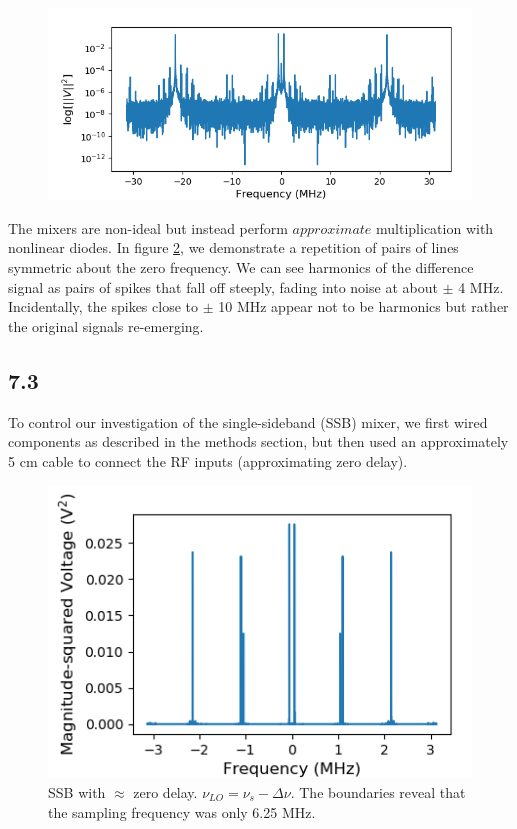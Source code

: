 \documentclass[a4paper]{article}
\begin{document}

\begin{figure}
\centering
\includegraphics[width=.8\linewidth]{7-2}
\caption{}
\label{fig:failure}
\end{figure}

The mixers are non-ideal but instead perform $approximate$ multiplication with nonlinear diodes. In figure \ref{fig:intermods}, we demonstrate a repetition of pairs of lines symmetric about the zero frequency. We can see harmonics of the difference signal as pairs of spikes that fall off steeply, fading into noise at about $\pm$ 4 MHz. Incidentally, the spikes close to $\pm$ 10 MHz appear not to be harmonics but rather the original signals re-emerging.

\subsection{7.3}

To control our investigation of the single-sideband (SSB) mixer, we first wired components as described in the methods section, but then used an approximately 5 cm cable to connect the RF inputs (approximating zero delay). %

\begin{figure}
\centering
\includegraphics[width=.8\linewidth]{7-3/pln}
\caption{SSB with $\approx$ zero delay. $\nu_{LO} = \nu_s - \Delta \nu$. The boundaries reveal that the sampling frequency was only 6.25 MHz.}
\label{fig:intermods}
\end{figure}
\end{document}
